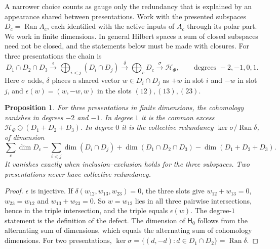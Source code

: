 \documentclass[11pt]{article}
\newtheorem{proposition}[theorem]{Proposition}
\theoremstyle{remark}
\newcommand{\HF}{\mathcal H_\Phi}
\newcommand{\Ran}{\operatorname{Ran}}
\begin{document}
A narrower choice counts as gauge only the redundancy that is explained by an appearance shared between presentations. Work with the presented subspaces $D_c=\overline{\Ran A_c}$, each identified with the active inputs of $A_c$ through its polar part. We work in finite dimensions. In general Hilbert spaces a sum of closed subspaces need not be closed, and the statements below must be made with closures. For three presentations the chain is
\[
 D_1\cap D_2\cap D_3\xrightarrow{\ \epsilon\ }\bigoplus_{i<j}(D_i\cap D_j)\xrightarrow{\ \delta\ }\bigoplus_cD_c\xrightarrow{\ \sigma\ }\HF,
 \qquad\text{degrees }-2,-1,0,1.
\]
Here $\sigma$ adds, $\delta$ places a shared vector $w\in D_i\cap D_j$ as $+w$ in slot $i$ and $-w$ in slot $j$, and $\epsilon(w)=(w,-w,w)$ in the slots $(12),(13),(23)$.

\begin{proposition}\label{prop:cech}
For three presentations in finite dimensions, the cohomology vanishes in degrees $-2$ and $-1$. In degree $1$ it is the common excess $\HF\ominus(D_1+D_2+D_3)$. In degree $0$ it is the \emph{collective redundancy} $\ker\sigma/\Ran\delta$, of dimension
\[
 \sum_c\dim D_c-\sum_{i<j}\dim(D_i\cap D_j)+\dim(D_1\cap D_2\cap D_3)-\dim(D_1+D_2+D_3).
\]
It vanishes exactly when inclusion--exclusion holds for the three subspaces. Two presentations never have collective redundancy.
\end{proposition}

\begin{proof}
$\epsilon$ is injective. If $\delta(w_{12},w_{13},w_{23})=0$, the three slots give $w_{12}+w_{13}=0$, $w_{23}=w_{12}$ and $w_{13}+w_{23}=0$. So $w=w_{12}$ lies in all three pairwise intersections, hence in the triple intersection, and the triple equals $\epsilon(w)$. The degree-$1$ statement is the definition of the defect. The dimension of $\mathsf H_0$ follows from the alternating sum of dimensions, which equals the alternating sum of cohomology dimensions. For two presentations, $\ker\sigma=\{(d,-d):d\in D_1\cap D_2\}=\Ran\delta$.
\end{proof}
\end{document}
